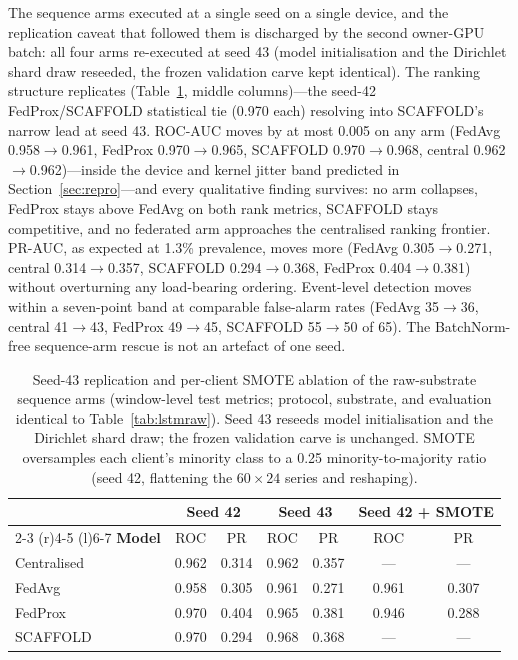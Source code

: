 The sequence arms executed at a single seed on a single
device, and the replication caveat that followed them is discharged
by the second owner-GPU batch: all four arms re-executed at seed 43
(model initialisation and the Dirichlet shard draw reseeded, the
frozen validation carve kept identical). The ranking structure
replicates (Table~\ref{tab:lstmrep}, middle columns)---the seed-42
FedProx/SCAFFOLD statistical tie (0.970 each) resolving into
SCAFFOLD's narrow lead at seed 43.
ROC-AUC moves by at most 0.005 on any arm (FedAvg
0.958$\to$0.961, FedProx 0.970$\to$0.965, SCAFFOLD
0.970$\to$0.968, central 0.962$\to$0.962)---inside the device and
kernel jitter band predicted in Section~\ref{sec:repro}---and
every qualitative finding survives: no arm collapses, FedProx
stays above FedAvg on both rank metrics, SCAFFOLD stays
competitive, and no federated arm approaches the centralised
ranking frontier. PR-AUC, as expected at 1.3\% prevalence, moves
more (FedAvg 0.305$\to$0.271, central 0.314$\to$0.357, SCAFFOLD
0.294$\to$0.368, FedProx 0.404$\to$0.381) without overturning any
load-bearing ordering. Event-level detection moves within a
seven-point band at comparable false-alarm rates (FedAvg
35$\to$36, central 41$\to$43, FedProx 49$\to$45, SCAFFOLD
55$\to$50 of 65). The BatchNorm-free sequence-arm rescue is not an artefact
of one seed.

\begin{table}[t]
\centering
\caption{Seed-43 replication and per-client SMOTE ablation of the
raw-substrate sequence arms (window-level test metrics; protocol,
substrate, and evaluation identical to
Table~\ref{tab:lstmraw}). Seed 43 reseeds model initialisation and
the Dirichlet shard draw; the frozen validation carve is unchanged.
SMOTE oversamples each client's minority class to a 0.25
minority-to-majority ratio (seed 42, flattening the $60\times24$
series and reshaping).}
\label{tab:lstmrep}
\small
\begin{tabular}{@{}l cc cc cc@{}}
\toprule
 & \multicolumn{2}{c}{\textbf{Seed 42}} &
 \multicolumn{2}{c}{\textbf{Seed 43}} &
 \multicolumn{2}{c}{\textbf{Seed 42 + SMOTE}} \\
\cmidrule(r){2-3} \cmidrule(r){4-5} \cmidrule(l){6-7}
\textbf{Model} & ROC & PR & ROC & PR & ROC & PR \\
\midrule
Centralised & 0.962 & 0.314 & 0.962 & 0.357 & --- & --- \\
FedAvg & 0.958 & 0.305 & 0.961 & 0.271 & 0.961 & 0.307 \\
FedProx & 0.970 & 0.404 & 0.965 & 0.381 & 0.946 & 0.288 \\
SCAFFOLD & 0.970 & 0.294 & 0.968 & 0.368 & --- & --- \\
\bottomrule
\end{tabular}
\end{table}

